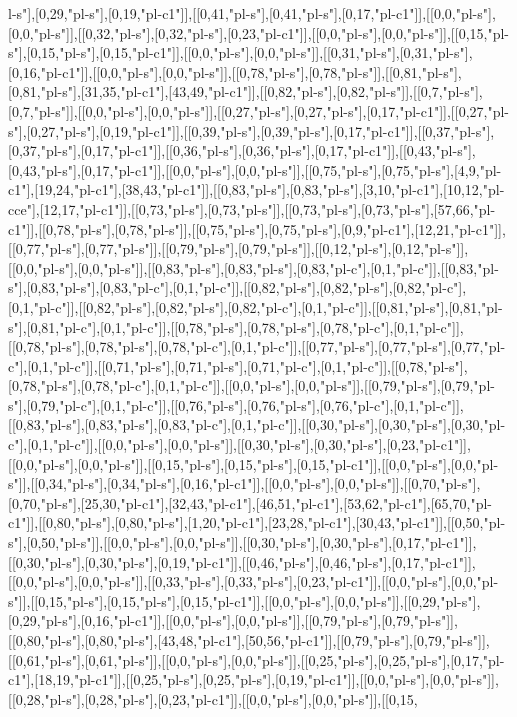 l-s"],[0,29,"pl-s"],[0,19,"pl-c1"]],[[0,41,"pl-s"],[0,41,"pl-s"],[0,17,"pl-c1"]],[[0,0,"pl-s"],[0,0,"pl-s"]],[[0,32,"pl-s"],[0,32,"pl-s"],[0,23,"pl-c1"]],[[0,0,"pl-s"],[0,0,"pl-s"]],[[0,15,"pl-s"],[0,15,"pl-s"],[0,15,"pl-c1"]],[[0,0,"pl-s"],[0,0,"pl-s"]],[[0,31,"pl-s"],[0,31,"pl-s"],[0,16,"pl-c1"]],[[0,0,"pl-s"],[0,0,"pl-s"]],[[0,78,"pl-s"],[0,78,"pl-s"]],[[0,81,"pl-s"],[0,81,"pl-s"],[31,35,"pl-c1"],[43,49,"pl-c1"]],[[0,82,"pl-s"],[0,82,"pl-s"]],[[0,7,"pl-s"],[0,7,"pl-s"]],[[0,0,"pl-s"],[0,0,"pl-s"]],[[0,27,"pl-s"],[0,27,"pl-s"],[0,17,"pl-c1"]],[[0,27,"pl-s"],[0,27,"pl-s"],[0,19,"pl-c1"]],[[0,39,"pl-s"],[0,39,"pl-s"],[0,17,"pl-c1"]],[[0,37,"pl-s"],[0,37,"pl-s"],[0,17,"pl-c1"]],[[0,36,"pl-s"],[0,36,"pl-s"],[0,17,"pl-c1"]],[[0,43,"pl-s"],[0,43,"pl-s"],[0,17,"pl-c1"]],[[0,0,"pl-s"],[0,0,"pl-s"]],[[0,75,"pl-s"],[0,75,"pl-s"],[4,9,"pl-c1"],[19,24,"pl-c1"],[38,43,"pl-c1"]],[[0,83,"pl-s"],[0,83,"pl-s"],[3,10,"pl-c1"],[10,12,"pl-cce"],[12,17,"pl-c1"]],[[0,73,"pl-s"],[0,73,"pl-s"]],[[0,73,"pl-s"],[0,73,"pl-s"],[57,66,"pl-c1"]],[[0,78,"pl-s"],[0,78,"pl-s"]],[[0,75,"pl-s"],[0,75,"pl-s"],[0,9,"pl-c1"],[12,21,"pl-c1"]],[[0,77,"pl-s"],[0,77,"pl-s"]],[[0,79,"pl-s"],[0,79,"pl-s"]],[[0,12,"pl-s"],[0,12,"pl-s"]],[[0,0,"pl-s"],[0,0,"pl-s"]],[[0,83,"pl-s"],[0,83,"pl-s"],[0,83,"pl-c"],[0,1,"pl-c"]],[[0,83,"pl-s"],[0,83,"pl-s"],[0,83,"pl-c"],[0,1,"pl-c"]],[[0,82,"pl-s"],[0,82,"pl-s"],[0,82,"pl-c"],[0,1,"pl-c"]],[[0,82,"pl-s"],[0,82,"pl-s"],[0,82,"pl-c"],[0,1,"pl-c"]],[[0,81,"pl-s"],[0,81,"pl-s"],[0,81,"pl-c"],[0,1,"pl-c"]],[[0,78,"pl-s"],[0,78,"pl-s"],[0,78,"pl-c"],[0,1,"pl-c"]],[[0,78,"pl-s"],[0,78,"pl-s"],[0,78,"pl-c"],[0,1,"pl-c"]],[[0,77,"pl-s"],[0,77,"pl-s"],[0,77,"pl-c"],[0,1,"pl-c"]],[[0,71,"pl-s"],[0,71,"pl-s"],[0,71,"pl-c"],[0,1,"pl-c"]],[[0,78,"pl-s"],[0,78,"pl-s"],[0,78,"pl-c"],[0,1,"pl-c"]],[[0,0,"pl-s"],[0,0,"pl-s"]],[[0,79,"pl-s"],[0,79,"pl-s"],[0,79,"pl-c"],[0,1,"pl-c"]],[[0,76,"pl-s"],[0,76,"pl-s"],[0,76,"pl-c"],[0,1,"pl-c"]],[[0,83,"pl-s"],[0,83,"pl-s"],[0,83,"pl-c"],[0,1,"pl-c"]],[[0,30,"pl-s"],[0,30,"pl-s"],[0,30,"pl-c"],[0,1,"pl-c"]],[[0,0,"pl-s"],[0,0,"pl-s"]],[[0,30,"pl-s"],[0,30,"pl-s"],[0,23,"pl-c1"]],[[0,0,"pl-s"],[0,0,"pl-s"]],[[0,15,"pl-s"],[0,15,"pl-s"],[0,15,"pl-c1"]],[[0,0,"pl-s"],[0,0,"pl-s"]],[[0,34,"pl-s"],[0,34,"pl-s"],[0,16,"pl-c1"]],[[0,0,"pl-s"],[0,0,"pl-s"]],[[0,70,"pl-s"],[0,70,"pl-s"],[25,30,"pl-c1"],[32,43,"pl-c1"],[46,51,"pl-c1"],[53,62,"pl-c1"],[65,70,"pl-c1"]],[[0,80,"pl-s"],[0,80,"pl-s"],[1,20,"pl-c1"],[23,28,"pl-c1"],[30,43,"pl-c1"]],[[0,50,"pl-s"],[0,50,"pl-s"]],[[0,0,"pl-s"],[0,0,"pl-s"]],[[0,30,"pl-s"],[0,30,"pl-s"],[0,17,"pl-c1"]],[[0,30,"pl-s"],[0,30,"pl-s"],[0,19,"pl-c1"]],[[0,46,"pl-s"],[0,46,"pl-s"],[0,17,"pl-c1"]],[[0,0,"pl-s"],[0,0,"pl-s"]],[[0,33,"pl-s"],[0,33,"pl-s"],[0,23,"pl-c1"]],[[0,0,"pl-s"],[0,0,"pl-s"]],[[0,15,"pl-s"],[0,15,"pl-s"],[0,15,"pl-c1"]],[[0,0,"pl-s"],[0,0,"pl-s"]],[[0,29,"pl-s"],[0,29,"pl-s"],[0,16,"pl-c1"]],[[0,0,"pl-s"],[0,0,"pl-s"]],[[0,79,"pl-s"],[0,79,"pl-s"]],[[0,80,"pl-s"],[0,80,"pl-s"],[43,48,"pl-c1"],[50,56,"pl-c1"]],[[0,79,"pl-s"],[0,79,"pl-s"]],[[0,61,"pl-s"],[0,61,"pl-s"]],[[0,0,"pl-s"],[0,0,"pl-s"]],[[0,25,"pl-s"],[0,25,"pl-s"],[0,17,"pl-c1"],[18,19,"pl-c1"]],[[0,25,"pl-s"],[0,25,"pl-s"],[0,19,"pl-c1"]],[[0,0,"pl-s"],[0,0,"pl-s"]],[[0,28,"pl-s"],[0,28,"pl-s"],[0,23,"pl-c1"]],[[0,0,"pl-s"],[0,0,"pl-s"]],[[0,15,